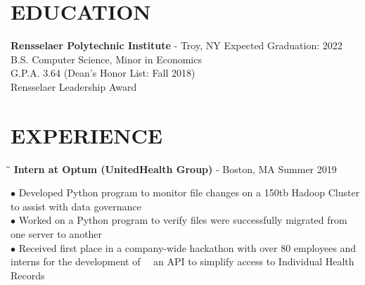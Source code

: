 \documentclass{res}
\begin{document}

\address{\bf  ADDRESS\\11 Riverside Drive, Apt. 7WE\\New York, NY 10023}
\address{\bf Contact Info \\ eli@elischiff.org \\   (646) 574-5224}

\begin{resume}

\vspace{-0.1in}
\section{EDUCATION}
    {\bf Rensselaer Polytechnic Institute} - Troy, NY \hfill Expected Graduation: 2022 \\
    B.S. Computer Science,
    Minor in Economics  \\
    G.P.A. 3.64 (Dean's Honor List: Fall 2018)\\
    Rensselaer Leadership Award \\

\vspace{-0.1in}
\section{EXPERIENCE}
   \vspace{-0.1in}
   \begin{tabbing}
   \hspace{2.3in}\= \hspace{3.8in}\= \kill
    {\bf Intern at Optum (UnitedHealth Group)} - Boston, MA   \>  \>Summer 2019
   \end{tabbing}\vspace{-20pt}
    $\bullet$ Developed Python program to monitor file changes on a 150tb Hadoop Cluster to assist with data governance\\
    $\bullet$ Worked on a Python program to verify files were successfully migrated from one server to another\\
    $\bullet$ Received first place in a company-wide hackathon with over 80 employees and interns for the development of $~~~$ an API to simplify access to Individual Health Records
    \vspace{-15pt}


\end{resume}
\end{document}
